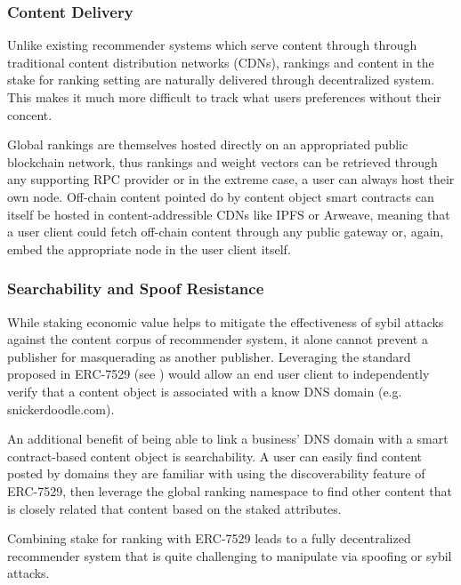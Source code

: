 \subsubsection{Content Delivery}

Unlike existing recommender systems which serve content through through traditional content distribution networks (CDNs), rankings and content in the stake for ranking setting are naturally delivered through decentralized system. This makes it much more difficult to track what users preferences without their concent. 

Global rankings are themselves hosted directly on an appropriated public blockchain network, thus rankings and weight vectors can be retrieved through any supporting RPC provider or in the extreme case, a user can always host their own node. Off-chain content pointed do by content object smart contracts can itself be hosted in content-addressible CDNs like IPFS or Arweave, meaning that a user client could fetch off-chain content through any public gateway or, again, embed the appropriate node in the user client itself. 

\subsubsection{Searchability and Spoof Resistance}

While staking economic value helps to mitigate the effectiveness of sybil attacks against the content corpus of recommender system, it alone cannot prevent a publisher for masquerading as another publisher. Leveraging the standard proposed in ERC-7529 (see \cite{chapman2023erc7529}) would allow an end user client to independently verify that a content object is associated with a know DNS domain (e.g. snickerdoodle.com). 

An additional benefit of being able to link a business' DNS domain with a smart contract-based content object is searchability. A user can easily find content posted by domains they are familiar with using the discoverability feature of ERC-7529, then leverage the global ranking namespace to find other content that is closely related that content based on the staked attributes. 

Combining stake for ranking with ERC-7529 leads to a fully decentralized recommender system that is quite challenging to manipulate via spoofing or sybil attacks. 